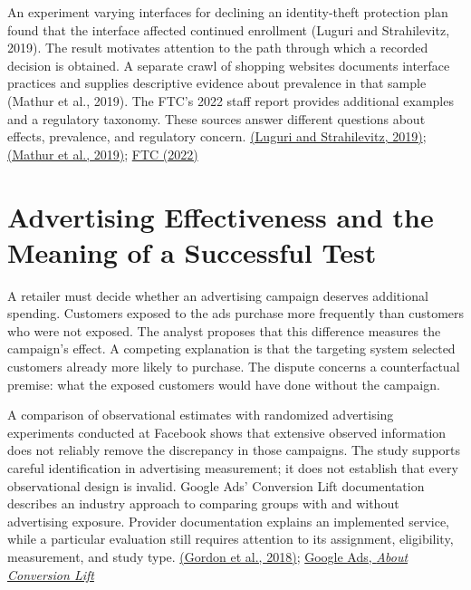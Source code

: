 An experiment varying interfaces for declining an identity-theft
protection plan found that the interface affected continued enrollment
(Luguri and Strahilevitz, 2019). The result motivates attention to the
path through which a recorded decision is obtained. A separate crawl of
shopping websites documents interface practices and supplies descriptive
evidence about prevalence in that sample (Mathur et al., 2019). The
FTC's 2022 staff report provides additional examples and a regulatory
taxonomy. These sources answer different questions about effects,
prevalence, and regulatory concern.
\href{https://oag.ca.gov/sites/all/files/agweb/pdfs/privacy/shining-a-light-on-dark-patterns.pdf}{(Luguri
and Strahilevitz, 2019)};
\href{https://arxiv.org/abs/1907.07032}{(Mathur et al., 2019)};
\href{https://www.ftc.gov/reports/bringing-dark-patterns-light}{FTC
(2022)}


\hypertarget{M09-advertising-effectiveness-and-the-meaning-of-a-successful-test}{%
\section{Advertising Effectiveness and the Meaning of a Successful
Test}\label{M09-advertising-effectiveness-and-the-meaning-of-a-successful-test}}

\noindent \noindent A retailer must decide whether an advertising campaign
deserves additional spending. Customers exposed to the ads purchase more
frequently than customers who were not exposed. The analyst proposes
that this difference measures the campaign's effect. A competing
explanation is that the targeting system selected customers already more
likely to purchase. The dispute concerns a counterfactual premise: what
the exposed customers would have done without the campaign.

A comparison of observational estimates with randomized advertising
experiments conducted at Facebook shows that extensive observed
information does not reliably remove the discrepancy in those campaigns.
The study supports careful identification in advertising measurement; it
does not establish that every observational design is invalid. Google
Ads' Conversion Lift documentation describes an industry approach to
comparing groups with and without advertising exposure. Provider
documentation explains an implemented service, while a particular
evaluation still requires attention to its assignment, eligibility,
measurement, and study type.
\href{https://www.kellogg.northwestern.edu/faculty/gordon_b/files/fb_comparison.pdf}{(Gordon
et al., 2018)};
\href{https://support.google.com/google-ads/answer/12003020?hl=en}{Google
Ads, \emph{About Conversion Lift}}

